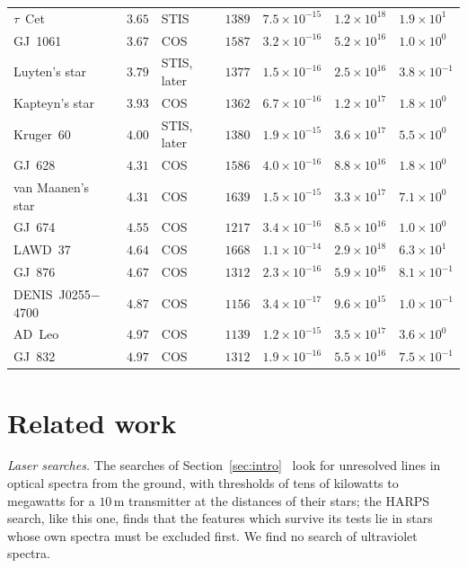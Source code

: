 \documentclass[3p,11pt]{elsarticle}
\begin{document}
\begin{table}[t]
\begin{tabular}{@{}lrlrlll@{}}
$\tau$~Cet & $3.65$ & STIS & $1389$ & $7.5\times10^{-15}$ & $1.2\times10^{18}$ & $1.9\times10^{1}$\\
GJ~1061 & $3.67$ & COS & $1587$ & $3.2\times10^{-16}$ & $5.2\times10^{16}$ & $1.0\times10^{0}$\\
Luyten's star & $3.79$ & STIS, later & $1377$ & $1.5\times10^{-16}$ & $2.5\times10^{16}$ & $3.8\times10^{-1}$\\
Kapteyn's star & $3.93$ & COS & $1362$ & $6.7\times10^{-16}$ & $1.2\times10^{17}$ & $1.8\times10^{0}$\\
Kruger~60 & $4.00$ & STIS, later & $1380$ & $1.9\times10^{-15}$ & $3.6\times10^{17}$ & $5.5\times10^{0}$\\
GJ~628 & $4.31$ & COS & $1586$ & $4.0\times10^{-16}$ & $8.8\times10^{16}$ & $1.8\times10^{0}$\\
van Maanen's star & $4.31$ & COS & $1639$ & $1.5\times10^{-15}$ & $3.3\times10^{17}$ & $7.1\times10^{0}$\\
GJ~674 & $4.55$ & COS & $1217$ & $3.4\times10^{-16}$ & $8.5\times10^{16}$ & $1.0\times10^{0}$\\
LAWD~37 & $4.64$ & COS & $1668$ & $1.1\times10^{-14}$ & $2.9\times10^{18}$ & $6.3\times10^{1}$\\
GJ~876 & $4.67$ & COS & $1312$ & $2.3\times10^{-16}$ & $5.9\times10^{16}$ & $8.1\times10^{-1}$\\
DENIS~J0255$-$4700 & $4.87$ & COS & $1156$ & $3.4\times10^{-17}$ & $9.6\times10^{15}$ & $1.0\times10^{-1}$\\
AD~Leo & $4.97$ & COS & $1139$ & $1.2\times10^{-15}$ & $3.5\times10^{17}$ & $3.6\times10^{0}$\\
GJ~832 & $4.97$ & COS & $1312$ & $1.9\times10^{-16}$ & $5.5\times10^{16}$ & $7.5\times10^{-1}$\\
\bottomrule
\end{tabular}
\end{table}

\section{Related work}\label{sec:related}

\emph{Laser searches.} The searches of
Section~\ref{sec:intro}~\cite{ReinesMarcy2002,TellisMarcy2015,TellisMarcy2017,Zuckerman2023,FieldsGoodman2025}
look for unresolved lines in optical spectra from the ground, with thresholds of tens of
kilowatts to megawatts for a $10$\,m transmitter at the distances of their stars; the
HARPS search, like this one, finds that the features which survive its tests lie in
stars whose own spectra must be excluded first. We find no search of ultraviolet
spectra.
\end{document}
